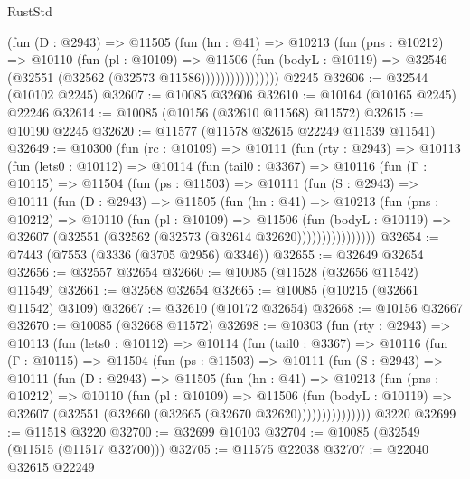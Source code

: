 \begin{lexlean}{RustStd}
\begin{coremodule}
                    (fun (D : @2943) =>
                    @11505
                      (fun (hn : @41) =>
                      @10213
                        (fun (pns : @10212) =>
                        @10110
                          (fun (pl : @10109) =>
                          @11506
                            (fun (bodyL : @10119) =>
                            @32546 (@32551 (@32562 (@32573 @11586))))))))))))))))
    @2245
@32606 := @32544 (@10102 @2245)
@32607 := @10085 @32606
@32610 := @10164 (@10165 @2245) @22246
@32614 := @10085 (@10156 (@32610 @11568) @11572)
@32615 := @10190 @2245
@32620 := @11577 (@11578 @32615 @22249 @11539 @11541)
@32649 := @10300
    (fun (rc : @10109) =>
    @10111
      (fun (rty : @2943) =>
      @10113
        (fun (lets0 : @10112) =>
        @10114
          (fun (tail0 : @3367) =>
          @10116
            (fun (Γ : @10115) =>
            @11504
              (fun (ps : @11503) =>
              @10111
                (fun (S : @2943) =>
                @10111
                  (fun (D : @2943) =>
                  @11505
                    (fun (hn : @41) =>
                    @10213
                      (fun (pns : @10212) =>
                      @10110
                        (fun (pl : @10109) =>
                        @11506
                          (fun (bodyL : @10119) =>
                          @32607 (@32551 (@32562 (@32573 (@32614 @32620))))))))))))))))
@32654 := @7443 (@7553 (@3336 (@3705 @2956) @3346))
@32655 := @32649 @32654
@32656 := @32557 @32654
@32660 := @10085 (@11528 (@32656 @11542) @11549)
@32661 := @32568 @32654
@32665 := @10085 (@10215 (@32661 @11542) @3109)
@32667 := @32610 (@10172 @32654)
@32668 := @10156 @32667
@32670 := @10085 (@32668 @11572)
@32698 := @10303
    (fun (rty : @2943) =>
    @10113
      (fun (lets0 : @10112) =>
      @10114
        (fun (tail0 : @3367) =>
        @10116
          (fun (Γ : @10115) =>
          @11504
            (fun (ps : @11503) =>
            @10111
              (fun (S : @2943) =>
              @10111
                (fun (D : @2943) =>
                @11505
                  (fun (hn : @41) =>
                  @10213
                    (fun (pns : @10212) =>
                    @10110
                      (fun (pl : @10109) =>
                      @11506
                        (fun (bodyL : @10119) =>
                        @32607 (@32551 (@32660 (@32665 (@32670 @32620)))))))))))))))
    @3220
@32699 := @11518 @3220
@32700 := @32699 @10103
@32704 := @10085 (@32549 (@11515 (@11517 @32700)))
@32705 := @11575 @22038
@32707 := @22040 @32615 @22249

\end{coremodule}
\end{lexlean}
